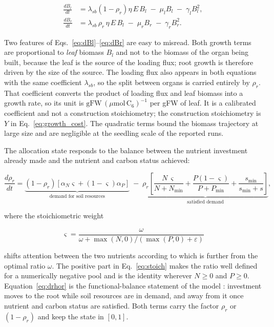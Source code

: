 \begin{align}
\frac{dB_l}{dt}
&= \lambda_{sb}\left(1-\rho_r\right)\eta\,E\,B_l
\;-\; \mu_l B_l \;-\; \gamma_l B_l^{2},
\label{eq:dBl}\\[3pt]
\frac{dB_r}{dt}
&= \lambda_{sb}\,\rho_r\,\eta\,E\,B_l
\;-\; \mu_r B_r \;-\; \gamma_r B_r^{2}.
\label{eq:dBr}
\end{align}

Two features of Eqs.~\eqref{eq:dBl}--\eqref{eq:dBr} are easy to misread. Both
growth terms are proportional to \emph{leaf} biomass $B_l$ and not to the
biomass of the organ being built, because the leaf is the source of the loading
flux; root growth is therefore driven by the size of the source. The loading flux
also appears in both equations with the same coefficient $\lambda_{sb}$, so the
split between organs is carried entirely by $\rho_r$. That coefficient converts
the product of loading flux and leaf biomass into a growth rate, so its unit is
$\mathrm{gFW}\,(\mu\mathrm{mol\,C_6})^{-1}$ per gFW of leaf. It is a calibrated
coefficient and not a construction stoichiometry; the construction stoichiometry
is $Y$ in Eq.~\eqref{eq:growth_cost}. The quadratic terms bound the biomass
trajectory at large size and are negligible at the seedling scale of the reported
runs.

The allocation state responds to the balance between the nutrient investment
already made and the nutrient and carbon status achieved:

\begin{equation}
\frac{d\rho_r}{dt}
= \underbrace{\left(1-\rho_r\right)
\left[\alpha_N \varsigma + \left(1-\varsigma\right)\alpha_P\right]}_{\text{demand for soil resources}}
\;-\;
\underbrace{\rho_r
\left[
\frac{N\,\varsigma}{N+N_{\min}}
+ \frac{P\left(1-\varsigma\right)}{P+P_{\min}}
+ \frac{s_{\min}}{s_{\min}+s}
\right]}_{\text{satisfied demand}} ,
\label{eq:drhor}
\end{equation}

where the stoichiometric weight

\begin{equation}
\varsigma = \frac{\omega}{\omega + \max(N,0)/\left(\max(P,0)+\varepsilon\right)}
\label{eq:stoich}
\end{equation}

shifts attention between the two nutrients according to which is further from
the optimal ratio $\omega$. The positive part in Eq.~\eqref{eq:stoich} makes the
ratio well defined for a numerically negative pool and is the identity wherever
$N \geq 0$ and $P \geq 0$. Equation~\eqref{eq:drhor} is the functional-balance
statement of the model \citep{Thornley1972,ThornleyJohnson1990}: investment
moves to the root while soil resources are in demand, and away from it once
nutrient and carbon status are satisfied. Both terms carry the factor
$\rho_r$ or $(1-\rho_r)$ and keep the state in $[0,1]$.

